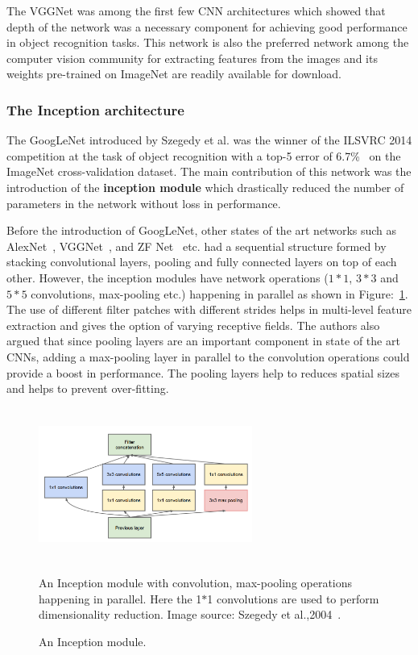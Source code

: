 The VGGNet was among the first few CNN architectures which showed that depth of the network was a necessary component for achieving good performance in object recognition tasks. This network is also the preferred network among the computer vision community for extracting features from the images and its weights pre-trained on ImageNet are readily available for download. 
\subsubsection{The Inception architecture}
 The GoogLeNet introduced by Szegedy et al.  was the winner of the ILSVRC 2014 competition at the task of object recognition with a top-5 error of 6.7\%~\cite{GoogleNet} on the ImageNet cross-validation dataset. The main contribution of this network was the introduction of the \textbf{inception module} which drastically reduced the number of parameters in the network without loss in performance.

Before the introduction of GoogLeNet, other states of the art networks such as AlexNet~\cite{Alexnet2012}, VGGNet~\cite{VGG16}, and ZF Net~\cite{ZFNET} etc. had a sequential structure formed by stacking convolutional layers, pooling and fully connected layers on top of each other. However, the inception modules have network operations ($1*1$, $3*3$ and $5*5$ convolutions, max-pooling etc.) happening in parallel as shown in Figure:~\ref{InceptionModules}. The use of different filter patches with different strides helps in multi-level feature extraction and gives the option of varying receptive fields.  The authors also argued that since pooling layers are an important component in state of the art CNNs, adding a max-pooling layer in parallel to the convolution operations could provide a boost in performance. The pooling layers help to reduces spatial sizes and helps to prevent over-fitting.   

\begin{figure}[t]
\centering
\includegraphics[width =7cm,height=5cm]{Figures/Incb}
\caption{An Inception module.}
\label{InceptionModules}
An Inception module with convolution, max-pooling operations happening in parallel. Here the 1$*$1 convolutions are used  to perform dimensionality reduction.
Image source: Szegedy et al.,2004~\cite{GoogleNet}.
\end{figure}

